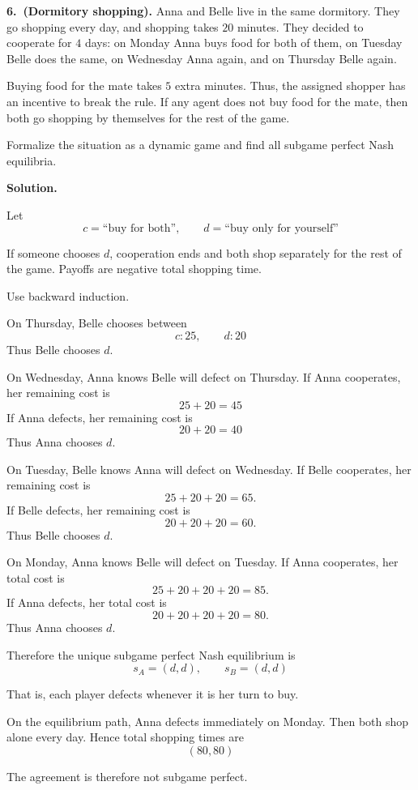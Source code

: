 \textbf{6.\ (Dormitory shopping).}
Anna and Belle live in the same dormitory. They go shopping every day, and
shopping takes \(20\) minutes. They decided to cooperate for \(4\) days:
on Monday Anna buys food for both of them, on Tuesday Belle does the same,
on Wednesday Anna again, and on Thursday Belle again.

Buying food for the mate takes \(5\) extra minutes. Thus, the assigned shopper
has an incentive to break the rule. If any agent does not buy food for the mate,
then both go shopping by themselves for the rest of the game.

Formalize the situation as a dynamic game and find all subgame perfect Nash
equilibria.

\textbf{Solution.}

Let
\[
c=\text{``buy for both''},\qquad d=\text{``buy only for yourself''}
\]

If someone chooses \(d\), cooperation ends and both shop separately for the rest
of the game. Payoffs are negative total shopping time.

Use backward induction.

On Thursday, Belle chooses between
\[
c:25,\qquad d:20
\]
Thus Belle chooses \(d\).

On Wednesday, Anna knows Belle will defect on Thursday. If Anna cooperates, her
remaining cost is
\[
25+20=45
\]
If Anna defects, her remaining cost is
\[
20+20=40
\]
Thus Anna chooses \(d\).

On Tuesday, Belle knows Anna will defect on Wednesday. If Belle cooperates, her
remaining cost is
\[
25+20+20=65.
\]
If Belle defects, her remaining cost is
\[
20+20+20=60.
\]
Thus Belle chooses \(d\).

On Monday, Anna knows Belle will defect on Tuesday. If Anna cooperates, her
total cost is
\[
25+20+20+20=85.
\]
If Anna defects, her total cost is
\[
20+20+20+20=80.
\]
Thus Anna chooses \(d\).

Therefore the unique subgame perfect Nash equilibrium is
\[
s_A=(d,d),\qquad s_B=(d,d)
\]

That is, each player defects whenever it is her turn to buy.

On the equilibrium path, Anna defects immediately on Monday. Then both shop
alone every day. Hence total shopping times are
\[
(80,80)
\]

The agreement is therefore not subgame perfect.
